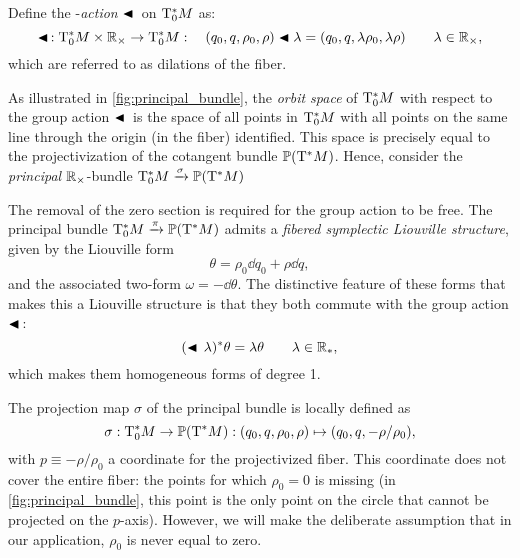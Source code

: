 Define the \mgroup-\emph{action} $\blacktriangleleft\,$ on $\mathrm{T}^*_0M$ as:
$$ \blacktriangleleft\,: \mathrm{T}^*_0M\times\mathbb{R}_{\times} \to \mathrm{T}^*_0M : \quad (q_0, q, \rho_0, \rho) \blacktriangleleft \lambda = (q_0, q, \lambda \rho_0, \lambda \rho ) \qquad \lambda \in \mathbb{R}_{\times},$$
which are referred to as dilations of the fiber.

As illustrated in \cref{fig:principal_bundle}, the \emph{orbit space} of $\mathrm{T}^*_0M$ with respect to the group action $\blacktriangleleft\,$ is the space of all points in $\mathrm{T}^*_0M$ with all points on the same line through the origin (in the fiber) identified. This space is precisely equal to the projectivization of the cotangent bundle $\mathbb{P}\qty(\mathrm{T}^*M)$. Hence, consider the \emph{principal} $\mathbb{R}_{\times}$-bundle $\mathrm{T}^*_0M\xrightarrow[]{\sigma}\mathbb{P}\qty(\mathrm{T}^*M)$
\begin{center}
\end{center}
The removal of the zero section is required for the group action to be free. The principal bundle $\mathrm{T}^*_0M\xrightarrow[]{\pi}\mathbb{P}\qty(\mathrm{T}^*M)$ admits a \emph{fibered symplectic Liouville structure}, given by the Liouville form \cite{Libermann1987}
$$ \theta = \rho_0\dd{q_0} + \rho\dd{q}, $$
and the associated two-form $\omega = -\dd{\theta}$. The distinctive feature of these forms that makes this a Liouville structure is that they both commute with the group action $\blacktriangleleft\,$: \cite{Libermann1987}
$$ (\blacktriangleleft\,\lambda)^* \theta = \lambda \theta \qquad \lambda \in \mathbb{R}_*,$$
which makes them homogeneous forms of degree 1.

The projection map $\sigma$ of the principal bundle is locally defined as 
\begin{equation}
    \sigma : \mathrm{T}^*_0M \to \mathbb{P}\qty(\mathrm{T}^*M): (q_0, q, \rho_0, \rho) \mapsto (q_0, q, -\rho/\rho_0), 
    \label{eq:principal_projection}
\end{equation}
with $p \equiv -\rho/\rho_0$ a coordinate for the projectivized fiber. This coordinate does not cover the entire fiber: the points for which $\rho_0 = 0$ is missing (in \cref{fig:principal_bundle}, this point is the only point on the circle that cannot be projected on the $p$-axis). However, we will make the deliberate assumption that in our application, $\rho_0$ is never equal to zero.

